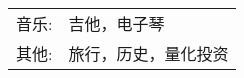 %
%



\begin{tabular}{rl}
    \textsc{音乐:} & 吉他，电子琴 \\
    \textsc{其他:} & 旅行，历史，量化投资\\
\end{tabular}